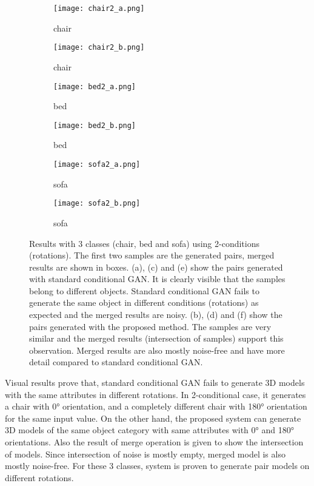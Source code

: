 \documentclass[runningheads]{llncs}
\begin{document}
\begin{figure}
\centering
\begin{subfigure}{.3\textwidth}
  \centering
  \texttt{[image: chair2\_a.png]}
  \caption{chair}
 \label{fig:sfig3a}
\end{subfigure}%
\qquad
\begin{subfigure}{.3\textwidth}
  \centering
  \texttt{[image: chair2\_b.png]}
  \caption{chair}
  \label{fig:sfig3b}
\end{subfigure}

\begin{subfigure}{.3\textwidth}
  \centering
  \texttt{[image: bed2\_a.png]}
  \caption{bed}
 \label{fig:sfig3c}
\end{subfigure}%
\qquad
\begin{subfigure}{.3\textwidth}
  \centering
  \texttt{[image: bed2\_b.png]}
  \caption{bed}
  \label{fig:sfig3d}
\end{subfigure}

\begin{subfigure}{.3\textwidth}
  \centering
  \texttt{[image: sofa2\_a.png]}
  \caption{sofa}
 \label{fig:sfig3e}
\end{subfigure}%
\qquad
\begin{subfigure}{.3\textwidth}
  \centering
  \texttt{[image: sofa2\_b.png]}
  \caption{sofa}
  \label{fig:sfig3f}
\end{subfigure}
\caption{Results with 3 classes (chair, bed and sofa) using 2-conditions (rotations).  The first two samples are the generated pairs, merged results are shown in boxes. (a), (c) and (e) show the pairs generated with standard conditional GAN. It is clearly visible that the samples belong to different objects. Standard conditional GAN fails to generate the same object in different conditions (rotations) as expected and the merged results are noisy. (b), (d) and (f) show the pairs generated with the proposed method. The samples are very similar and the merged results (intersection of samples) support this observation. Merged results are also mostly noise-free and have more detail compared to standard conditional GAN.}
\label{fig:fig3}
\end{figure}

Visual results prove that, standard conditional GAN fails to generate 3D models with the same attributes in different rotations. In 2-conditional case, it generates a chair with \ang{0} orientation, and a completely different chair with \ang{180} orientation for the same input value. On the other hand, the proposed system can generate 3D models of the same object category with same attributes with \ang{0} and \ang{180} orientations. Also the result of merge operation is given to show the intersection of models. Since intersection of noise is mostly empty, merged model is also mostly noise-free. For these 3 classes, system is proven to generate pair models on different rotations.
\end{document}
